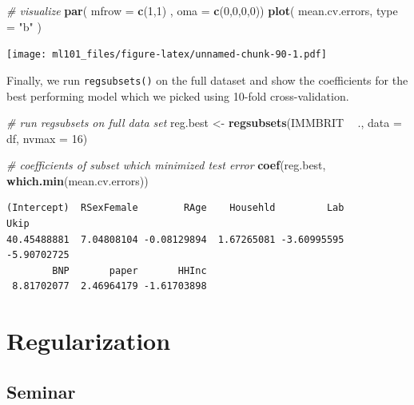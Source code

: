 \documentclass[]{article}
\newenvironment{Shaded}{\begin{snugshade}}{\end{snugshade}}
\newcommand{\CommentTok}[1]{\textcolor[rgb]{0.56,0.35,0.01}{\textit{#1}}}
\newcommand{\DataTypeTok}[1]{\textcolor[rgb]{0.13,0.29,0.53}{#1}}
\newcommand{\DecValTok}[1]{\textcolor[rgb]{0.00,0.00,0.81}{#1}}
\newcommand{\KeywordTok}[1]{\textcolor[rgb]{0.13,0.29,0.53}{\textbf{#1}}}
\newcommand{\NormalTok}[1]{#1}
\newcommand{\OperatorTok}[1]{\textcolor[rgb]{0.81,0.36,0.00}{\textbf{#1}}}
\newcommand{\StringTok}[1]{\textcolor[rgb]{0.31,0.60,0.02}{#1}}
\begin{document}
\begin{Shaded}
\begin{Highlighting}[]
\CommentTok{# visualize}
\KeywordTok{par}\NormalTok{( }\DataTypeTok{mfrow =} \KeywordTok{c}\NormalTok{(}\DecValTok{1}\NormalTok{,}\DecValTok{1}\NormalTok{) , }\DataTypeTok{oma =} \KeywordTok{c}\NormalTok{(}\DecValTok{0}\NormalTok{,}\DecValTok{0}\NormalTok{,}\DecValTok{0}\NormalTok{,}\DecValTok{0}\NormalTok{))}
\KeywordTok{plot}\NormalTok{( mean.cv.errors, }\DataTypeTok{type =} \StringTok{"b"}\NormalTok{ )}
\end{Highlighting}
\end{Shaded}

\texttt{[image: ml101\_files/figure-latex/unnamed-chunk-90-1.pdf]}

Finally, we run \texttt{regsubsets()} on the full dataset and show the coefficients for the best performing model which we picked using 10-fold cross-validation.

\begin{Shaded}
\begin{Highlighting}[]
\CommentTok{# run regsubsets on full data set}
\NormalTok{reg.best <-}\StringTok{ }\KeywordTok{regsubsets}\NormalTok{(IMMBRIT }\OperatorTok{~}\StringTok{ }\NormalTok{., }\DataTypeTok{data =}\NormalTok{ df, }\DataTypeTok{nvmax =} \DecValTok{16}\NormalTok{)}

\CommentTok{# coefficients of subset which minimized test error}
\KeywordTok{coef}\NormalTok{(reg.best, }\KeywordTok{which.min}\NormalTok{(mean.cv.errors))}
\end{Highlighting}
\end{Shaded}

\begin{verbatim}
(Intercept)  RSexFemale        RAge    Househld         Lab        Ukip 
40.45488881  7.04808104 -0.08129894  1.67265081 -3.60995595 -5.90702725 
        BNP       paper       HHInc 
 8.81702077  2.46964179 -1.61703898 
\end{verbatim}

\hypertarget{regularization}{%
\section{Regularization}\label{regularization}}

\hypertarget{seminar-3}{%
\subsection{Seminar}\label{seminar-3}}
\end{document}

